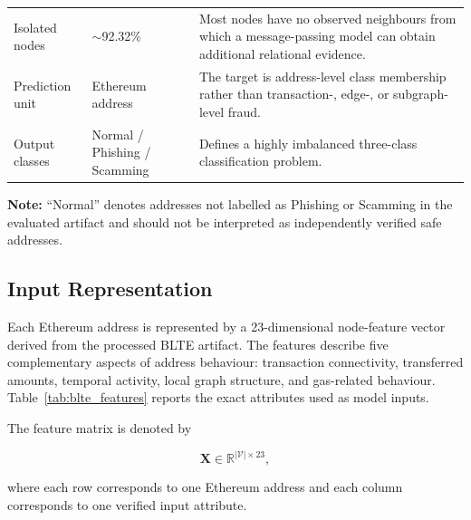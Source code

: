 \documentclass{ieeeaccess}
\begin{document}
\begin{table}[t]
\begin{tabularx}{\textwidth}{
>{\raggedright\arraybackslash}p{3.1cm}
>{\centering\arraybackslash}p{2.2cm}
>{\raggedright\arraybackslash}X
}
Isolated nodes
&
$\sim$92.32\%
&
Most nodes have no observed neighbours from which a message-passing model can obtain additional relational evidence.
\\[2pt]

Prediction unit
&
Ethereum address
&
The target is address-level class membership rather than transaction-, edge-, or subgraph-level fraud.
\\[2pt]

Output classes
&
Normal / Phishing / Scamming
&
Defines a highly imbalanced three-class classification problem.
\\

\bottomrule
\end{tabularx}

\vspace{2pt}

\begin{minipage}{0.97\textwidth}
\scriptsize
\textbf{Note:} ``Normal'' denotes addresses not labelled as Phishing or Scamming in the evaluated artifact and should not be interpreted as independently verified safe addresses.
\end{minipage}

\end{table}

\subsection{Input Representation}

Each Ethereum address is represented by a 23-dimensional node-feature vector derived from the processed BLTE artifact. The features describe five complementary aspects of address behaviour: transaction connectivity, transferred amounts, temporal activity, local graph structure, and gas-related behaviour. Table~\ref{tab:blte_features} reports the exact attributes used as model inputs.

The feature matrix is denoted by

\begin{equation}
\mathbf{X}\in\mathbb{R}^{|\mathcal{V}|\times 23},
\label{eq:feature_matrix}
\end{equation}

where each row corresponds to one Ethereum address and each column corresponds to one verified input attribute.
\end{document}
